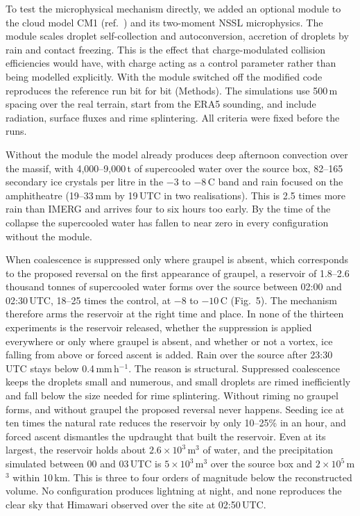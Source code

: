 \documentclass{nature}
\newcommand{\degC}{\,\textdegree C}
\begin{document}
To test the microphysical mechanism directly, we added an optional module to the cloud model CM1 (ref.~) and its two-moment NSSL microphysics\cite{mansell2010}. The module scales droplet self-collection and autoconversion, accretion of droplets by rain and contact freezing. This is the effect that charge-modulated collision efficiencies would have, with charge acting as a control parameter rather than being modelled explicitly. With the module switched off the modified code reproduces the reference run bit for bit (Methods). The simulations use 500\,m spacing over the real terrain, start from the ERA5 sounding, and include radiation\cite{iacono2008}, surface fluxes and rime splintering\cite{hallett1974,lawson2015}. All criteria were fixed before the runs.

Without the module the model already produces deep afternoon convection over the massif, with 4,000--9,000\,t of supercooled water over the source box, 82--165 secondary ice crystals per litre in the $-3$ to $-8$\degC{} band and rain focused on the amphitheatre (19--33\,mm by 19\,UTC in two realisations). This is 2.5 times more rain than IMERG and arrives four to six hours too early. By the time of the collapse the supercooled water has fallen to near zero in every configuration without the module.

When coalescence is suppressed only where graupel is absent, which corresponds to the proposed reversal on the first appearance of graupel, a reservoir of 1.8--2.6 thousand tonnes of supercooled water forms over the source between 02:00 and 02:30\,UTC, 18--25 times the control, at $-8$ to $-10$\degC{} (Fig.~5). The mechanism therefore arms the reservoir at the right time and place. In none of the thirteen experiments is the reservoir released, whether the suppression is applied everywhere or only where graupel is absent, and whether or not a vortex, ice falling from above or forced ascent is added. Rain over the source after 23:30\,UTC stays below 0.4\,mm\,h$^{-1}$. The reason is structural. Suppressed coalescence keeps the droplets small and numerous, and small droplets are rimed inefficiently and fall below the size needed for rime splintering\cite{hallett1974,field2017}. Without riming no graupel forms, and without graupel the proposed reversal never happens. Seeding ice at ten times the natural rate reduces the reservoir by only 10--25\% in an hour, and forced ascent dismantles the updraught that built the reservoir. Even at its largest, the reservoir holds about $2.6\times10^{3}$\,m$^{3}$ of water, and the precipitation simulated between 00 and 03\,UTC is $5\times10^{3}$\,m$^{3}$ over the source box and $2\times10^{5}$\,m$^{3}$ within 10\,km. This is three to four orders of magnitude below the reconstructed volume. No configuration produces lightning at night, and none reproduces the clear sky that Himawari observed over the site at 02:50\,UTC.
\end{document}
